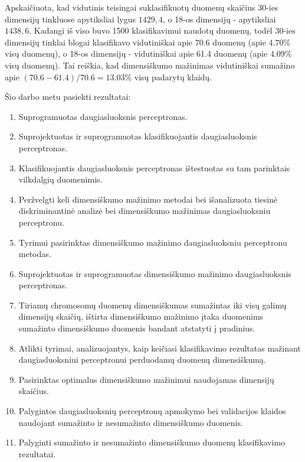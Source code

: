 \documentclass{VUMIFPSbakalaurinis}
\begin{document}
Apskaičiuota, kad vidutinis teisingai suklasifikuotų duomenų skaičius 30-ies dimensijų tinkluose apytiksliai lygus $1429,4$, o 18-os dimensijų - apytiksliai $1438,6$.
Kadangi iš viso buvo 1500 klasifikavimui naudotų duomenų, todėl 30-ies dimensijų tinklai blogai klasifikavo vidutiniškai apie 70.6 duomenų (apie $4.70\%$ visų duomenų), o 18-os dimensijų - vidutiniškai apie 61.4 duomenų (apie $4.09\%$ visų duomenų).
Tai reiškia, kad dimensiškumo mažinimas vidutiniškai sumažino apie $(70.6 - 61.4) / 70.6 = 13.03\%$ visų padarytų klaidų.




Šio darbo metu pasiekti rezultatai:
\begin{enumerate}
	\item Suprogramuotas daugiasluoksnis perceptronas.
	\item Suprojektuotas ir suprogramuotas klasifikuojantis daugiasluoksnis perceptronas.
	\item Klasifikuojantis daugiasluoksnis perceptronas ištestuotas su tam parinktais vilkdalgių duomenimis.

	\item Peržvelgti keli dimensiškumo mažinimo metodai bei išanalizuota tiesinė diskriminantinė analizė bei dimensiškumo mažinimas daugiasluoksniu perceptronu.
	\item Tyrimui pasirinktas dimensiškumo mažinimo daugiasluoksniu perceptronu metodas.
	\item Suprojektuotas ir suprogramuotas dimensiškumo mažinimo daugiasluoksnis perceptronas.
	\item Tiriamų chromosomų duomenų dimensiškumas sumažintas iki visų galimų dimensijų skaičių, ištirta dimensiškumo mažinimo įtaka duomenims sumažinto dimensiškumo duomenis bandant atstatyti į pradinius.

	\item Atlikti tyrimai, analizuojantys, kaip keičiasi klasifikavimo rezultatas mažinant daugiasluoksniui perceptronui perduodamų duomenų dimensiškumą.
	\item Pasirinktas optimalus dimensiškumo mažinimui naudojamas dimensijų skaičius.
	
	\item Palygintos daugiasluoksnių perceptronų apmokymo bei validacijos klaidos naudojant sumažinto ir nesumažinto dimensiškumo duomenis.
	\item Palyginti sumažinto ir nesumažinto dimensiškumo duomenų klasifikavimo rezultatai.
\end{enumerate}
\end{document}
